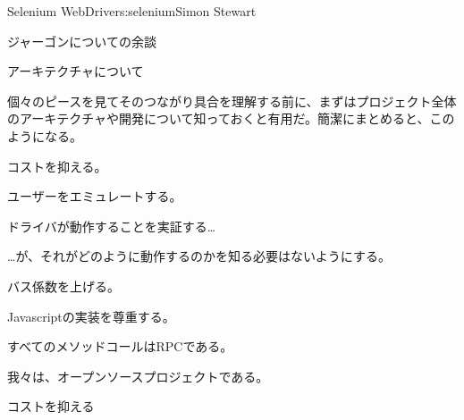 \begin{aosachapter}{Selenium WebDriver}{s:selenium}{Simon Stewart}
\begin{aosasect1}{ジャーゴンについての余談}
\end{aosasect1}

\begin{aosasect1}{アーキテクチャについて}

個々のピースを見てそのつながり具合を理解する前に、まずはプロジェクト全体のアーキテクチャや開発について知っておくと有用だ。簡潔にまとめると、このようになる。

\begin{aosaitemize}

\item コストを抑える。

\item ユーザーをエミュレートする。

\item ドライバが動作することを実証する{\ldots}

\item {\ldots}が、それがどのように動作するのかを知る必要はないようにする。

\item バス係数を上げる。

\item Javascriptの実装を尊重する。

\item すべてのメソッドコールはRPCである。

\item 我々は、オープンソースプロジェクトである。

\end{aosaitemize}

\begin{aosasect2}{コストを抑える}


\end{aosasect2}
\end{aosasect1}
\end{aosachapter}
